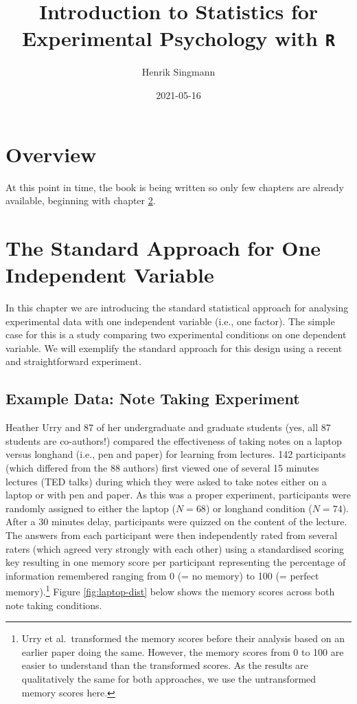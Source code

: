 \documentclass[
]{book}
\title{Introduction to Statistics for Experimental Psychology with \texttt{R}}
\author{Henrik Singmann}
\date{2021-05-16}
\begin{document}
\maketitle

{
\setcounter{tocdepth}{1}
\tableofcontents
}
\hypertarget{overview}{%
\chapter{Overview}\label{overview}}

At this point in time, the book is being written so only few chapters are already available, beginning with chapter \ref{standard1}.

\hypertarget{standard1}{%
\chapter{The Standard Approach for One Independent Variable}\label{standard1}}

In this chapter we are introducing the standard statistical approach for analysing experimental data with one independent variable (i.e., one factor). The simple case for this is a study comparing two experimental conditions on one dependent variable. We will exemplify the standard approach for this design using a recent and straightforward experiment.

\hypertarget{ex:urry}{%
\section{Example Data: Note Taking Experiment}\label{ex:urry}}

Heather Urry and 87 of her undergraduate and graduate students \citep{urry2021} (yes, all 87 students are co-authors!) compared the effectiveness of taking notes on a laptop versus longhand (i.e., pen and paper) for learning from lectures. 142 participants (which differed from the 88 authors) first viewed one of several 15 minutes lectures (TED talks) during which they were asked to take notes either on a laptop or with pen and paper. As this was a proper experiment, participants were randomly assigned to either the laptop (\(N = 68\)) or longhand condition (\(N = 74\)). After a 30 minutes delay, participants were quizzed on the content of the lecture. The answers from each participant were then independently rated from several raters (which agreed very strongly with each other) using a standardised scoring key resulting in one memory score per participant representing the percentage of information remembered ranging from 0 (= no memory) to 100 (= perfect memory).\footnote{Urry et al.~transformed the memory scores before their analysis based on an earlier paper doing the same. However, the memory scores from 0 to 100 are easier to understand than the transformed scores. As the results are qualitatively the same for both approaches, we use the untransformed memory scores here.} Figure \ref{fig:laptop-dist} below shows the memory scores across both note taking conditions.
\end{document}
